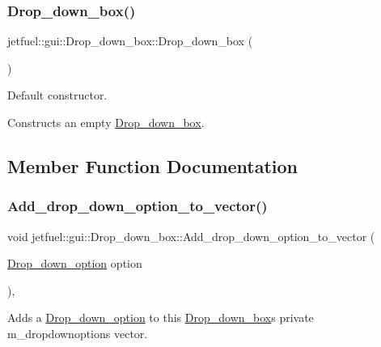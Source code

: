 \subsubsection{\texorpdfstring{Drop\+\_\+down\+\_\+box()}{Drop\_down\_box()}}
{\footnotesize\ttfamily jetfuel\+::gui\+::\+Drop\+\_\+down\+\_\+box\+::\+Drop\+\_\+down\+\_\+box (\begin{DoxyParamCaption}{ }\end{DoxyParamCaption})\hspace{0.3cm}{\ttfamily [inline]}}



Default constructor. 

Constructs an empty \hyperlink{classjetfuel_1_1gui_1_1Drop__down__box}{Drop\+\_\+down\+\_\+box}. 

\subsection{Member Function Documentation}
\mbox{\label{classjetfuel_1_1gui_1_1Drop__down__box_a7b1288e66e0276829df981a4c7a07081}} 
\subsubsection{\texorpdfstring{Add\+\_\+drop\+\_\+down\+\_\+option\+\_\+to\+\_\+vector()}{Add\_drop\_down\_option\_to\_vector()}}
{\footnotesize\ttfamily void jetfuel\+::gui\+::\+Drop\+\_\+down\+\_\+box\+::\+Add\+\_\+drop\+\_\+down\+\_\+option\+\_\+to\+\_\+vector (\begin{DoxyParamCaption}\item[{\hyperlink{structjetfuel_1_1gui_1_1Drop__down__box_1_1Drop__down__option}{Drop\+\_\+down\+\_\+option}}]{option }\end{DoxyParamCaption})\hspace{0.3cm}{\ttfamily [inline]}, {\ttfamily [protected]}}



Adds a \hyperlink{structjetfuel_1_1gui_1_1Drop__down__box_1_1Drop__down__option}{Drop\+\_\+down\+\_\+option} to this \hyperlink{classjetfuel_1_1gui_1_1Drop__down__box}{Drop\+\_\+down\+\_\+box}\textquotesingle{}s private m\+\_\+dropdownoptions vector. 

